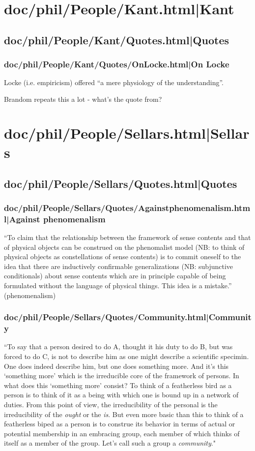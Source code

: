 \documentclass[12pt,a4paper]{report}
\begin{document}
\part{doc/phil/People/Kant.html|Kant}

\chapter{doc/phil/People/Kant/Quotes.html|Quotes}

\section{doc/phil/People/Kant/Quotes/OnLocke.html|On Locke}
Locke (i.e. empiricism) offered ``a mere physiology of the understanding''.

Brandom repeats this a lot - what's the quote from?
\part{doc/phil/People/Sellars.html|Sellars}

\chapter{doc/phil/People/Sellars/Quotes.html|Quotes}

\section{doc/phil/People/Sellars/Quotes/Againstphenomenalism.html|Against phenomenalism}
``To claim that the relationship between the framework of sense contents and
that of physical objects can be construed on the phenomalist model (NB: to
think of physical objects as constellations of sense contents) is to commit
oneself to the idea that there are inductively confirmable generalizations (NB:
 subjunctive conditionals) about sense contents which are in principle capable
 of being formulated without the language of physical things. This idea is a
 mistake.'' (phenomenalism)

\section{doc/phil/People/Sellars/Quotes/Community.html|Community}
``To say that a person desired to do A, thought it his duty to do B, but was forced to do C, is not to describe him as one might describe a scientific specimin. One does indeed describe him, but one does something more. And it's this `something more' which is the irreducible core of the framework of persons. In what does this `something more' consist? To think of a featherless bird as a person is to think of it as a being with which  one is bound up in a network of duties. From this point of view, the irreducibility of the personal is the irreducibility of the \emph{ought} or the \emph{is}. But even more basic than this to think of a featherless biped as a person is to construe its behavior in terms of actual or potential membership in an embracing group, each member of which thinks of itself as a member of the group. Let's call such a group a \emph{community}."
\end{document}
